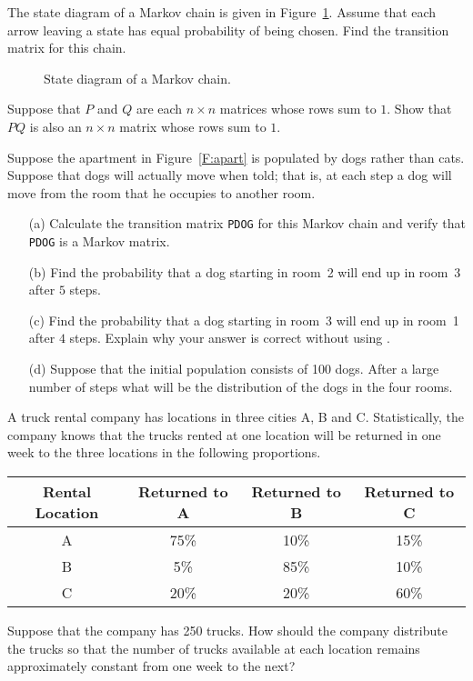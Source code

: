 \documentclass{ximera}
\begin{document}
\begin{exercise} \label{c4.10.3}
The state diagram of a Markov chain is given in Figure~\ref{F:Mchain}.
Assume that each arrow leaving a state has equal probability of being chosen.
Find the transition matrix for this chain.
\end{exercise}
\begin{figure}[htb]
        \centerline{%
        }
        \caption{State diagram of a Markov chain.}
        \label{F:Mchain}
\end{figure}


\begin{exercise} \label{c4.10.4}
Suppose that $P$ and $Q$ are each $n\times n$ matrices whose rows sum to $1$.
Show that $PQ$ is also an $n\times n$ matrix whose rows sum to $1$.
\end{exercise}



\CEXER

\begin{exercise} \label{c4.10.5}
Suppose the apartment in Figure~\ref{F:apart} is populated by dogs rather than
cats.  Suppose that dogs will actually move when told; that is, at each step
a dog will move from the room that he occupies to another room.
\begin{itemize}
\item[(a)]  Calculate the transition matrix {\tt PDOG} for this Markov chain
and verify that {\tt PDOG} is a Markov matrix.
\item[(b)]  Find the probability that a dog starting in room~2 will end up in
room~3 after $5$ steps.
\item[(c)]  Find the probability that a dog starting in room~3 will end up in
room~1 after $4$ steps.  Explain why your answer is correct without using
\Matlabp.
\item[(d)]  Suppose that the initial population consists of 100 dogs.  After
a large number of steps what will be the distribution of the dogs in the four
rooms.
\end{itemize}
\end{exercise}

\begin{exercise} \label{c4.10.6}
A truck rental company has locations in three cities A, B and C.
Statistically, the company knows that the trucks rented at one location will
be returned in one week to the three locations in the following proportions.
\begin{center}
\begin{tabular}{|c||c|c|c|}
\hline
Rental Location &  Returned to A & Returned to B & Returned to C\\
\hline
A  & 75\% & 10\%  & 15\% \\
\hline
B & 5\% & 85\% & 10\% \\
\hline
C & 20\% & 20\% & 60\%\\
\hline
\end{tabular}
\end{center}
Suppose that the company has 250 trucks.  How should the company distribute
the trucks so that the number of trucks available at each location remains
approximately constant from one week to the next?
\end{exercise}
\end{document}
